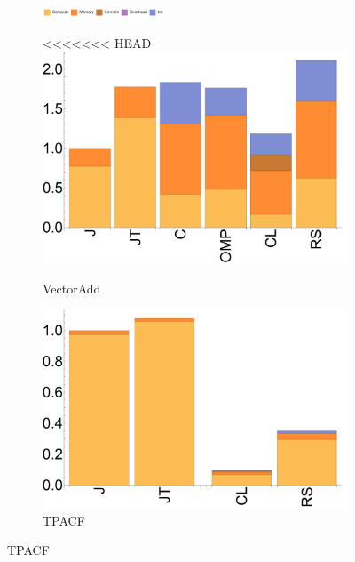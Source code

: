 \begin{figure}[ht]

  \begin{subfigure}[b]{\textwidth}
          \centering
          \includegraphics[width=0.4\textwidth]{data/legend.pdf}
  \end{subfigure}

  \begin{subfigure}[b]{0.3\textwidth}
<<<<<<< HEAD
      \includegraphics[width=\textwidth]{data/bbattery_vectoradd_nexus5.pdf}
      \caption{VectorAdd}\label{fig:b_vectoradd}
  \end{subfigure}

  \begin{subfigure}[b]{0.3\textwidth}
      \includegraphics[width=\textwidth]{data/bbattery_tpacf_nexus5.pdf}
      \caption{TPACF} \label{fig:b_TPACF}
  \end{subfigure}


\end{figure}
